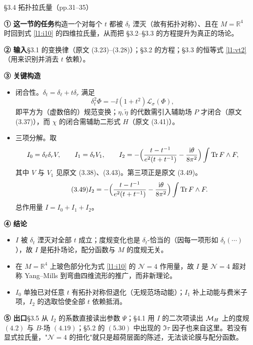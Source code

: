 \begin{kcard}{§3.4 拓扑拉氏量（pp.31--35）}

\noindent\textbf{① 这一节的任务}\quad 构造一个对每个 $t$ 都被 $\delta_t$ 湮灭（故有拓扑对称）、且在 $M=\mathbb R^4$ 时回到式 \eqref{l1:i10} 的四维拉氏量，从而把 \S3.2--\S3.3 的方程提升为真正的场论。\pA{}

\noindent\textbf{② 输入}\quad \S3.1 的变换律（原文 (3.23)--(3.28)）；\S3.2 的方程；\S3.3 的恒等式 \eqref{l1:vt2}（用来识别并消去 $t$ 依赖）。

\noindent\textbf{③ 关键构造}\quad
\begin{itemize}
\item 闭合性。$\delta_t=\delta_\ell+t\delta_r$ 满足
\begin{equation}\label{l1:dt2}\tag{3.42}
\delta_t^2\Phi=-\ii(1+t^2)\mathcal L_\sigma(\Phi),
\end{equation}
即平方为（虚数倍的）规范变换；$\eta,\tilde\eta$ 的代数需引入辅助场 $P$ 才闭合（原文 (3.37)），而 $\chi$ 的闭合需辅助二形式 $H$（原文 (3.41)）。\pA{}
\item 三项分解。取
\[
I_0=\delta_\ell\delta_r V,\qquad I_1=\delta_t V_1,\qquad
I_2=-\Bigl(\frac{t-t^{-1}}{e^2(t+t^{-1})}-\frac{\mathrm{i}\theta}{8\pi^2}\Bigr)\int\operatorname{Tr} F\wedge F,
\]
其中 $V$ 与 $V_1$ 见原文 (3.38)、(3.43)。第三项正是原文 (3.49)。
\begin{equation}\label{l1:i2}\tag{3.49}
I_2=-\Bigl(\frac{t-t^{-1}}{e^2(t+t^{-1})}-\frac{\mathrm{i}\theta}{8\pi^2}\Bigr)\int\operatorname{Tr} F\wedge F .
\end{equation}
总作用量 $I=I_0+I_1+I_2$。\pA{}
\end{itemize}

\noindent\textbf{④ 结论}\quad
\begin{itemize}
\item $I$ 被 $\delta_t$ 湮灭对全部 $t$ 成立；度规变化也是 $\delta_t$-恰当的（因每一项形如 $\delta_t(\cdots)$），故 $I$ 是拓扑场论，配分函数与 $M$ 的度规无关。\pA{}
\item 在 $M=\mathbb R^4$ 上玻色部分化为式 \eqref{l1:i10} 的 $\mathcal N=4$ 作用量，故 $I$ 是 $\mathcal N=4$ 超对称 Yang--Mills 到弯曲四维流形的推广，而非新理论。\pA{}
\item $I_0$ 单独已对任意 $t$ 有拓扑对称但退化（无规范场动能）；$I_1$ 补上动能与费米子项，$I_2$ 的选取恰使全部 $t$ 依赖抵消。\pA{}
\end{itemize}

\noindent\textbf{⑤ 出口}\quad \S3.5 从 $I_2$ 的系数直接读出参数 $\Psi$；\S4.1 用 $I$ 的二次项读出 $\mathcal{M}_H$ 上的度规 $(4.2)$ 与 $B$-场 $(4.19)$；\S5.2 的 $(5.30)$ 中出现的 $\Im\tau$ 因子也来自这里。若没有显式拉氏量，"$\mathcal N=4$ 的扭化"就只是超荷层面的陈述，无法谈论膜与配分函数。\pB{}


\end{kcard}
